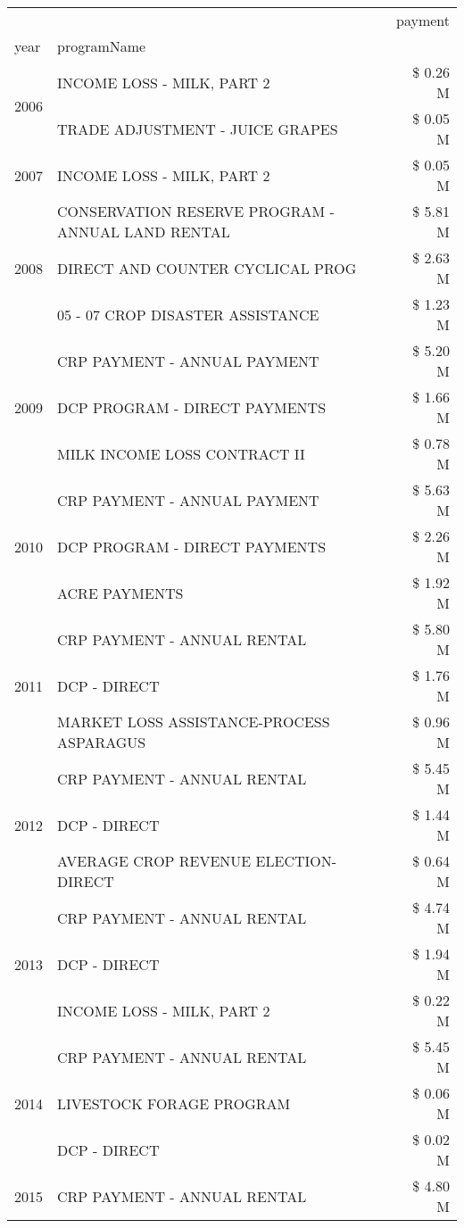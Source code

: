 \begin{tabular}{llr}
\toprule
 &  & payment \\
year & programName &  \\
\midrule
\multirow[t]{2}{*}{2006} & INCOME LOSS - MILK, PART 2 & \$ 0.26 M \\
 & TRADE ADJUSTMENT - JUICE GRAPES & \$ 0.05 M \\
\cline{1-3}
2007 & INCOME LOSS - MILK, PART 2 & \$ 0.05 M \\
\cline{1-3}
\multirow[t]{3}{*}{2008} & CONSERVATION RESERVE PROGRAM - ANNUAL LAND RENTAL & \$ 5.81 M \\
 & DIRECT AND COUNTER CYCLICAL PROG & \$ 2.63 M \\
 & 05 - 07 CROP DISASTER ASSISTANCE & \$ 1.23 M \\
\cline{1-3}
\multirow[t]{3}{*}{2009} & CRP PAYMENT - ANNUAL PAYMENT & \$ 5.20 M \\
 & DCP PROGRAM - DIRECT PAYMENTS & \$ 1.66 M \\
 & MILK INCOME LOSS CONTRACT II & \$ 0.78 M \\
\cline{1-3}
\multirow[t]{3}{*}{2010} & CRP PAYMENT - ANNUAL PAYMENT & \$ 5.63 M \\
 & DCP PROGRAM - DIRECT PAYMENTS & \$ 2.26 M \\
 & ACRE PAYMENTS & \$ 1.92 M \\
\cline{1-3}
\multirow[t]{3}{*}{2011} & CRP PAYMENT - ANNUAL RENTAL & \$ 5.80 M \\
 & DCP - DIRECT & \$ 1.76 M \\
 & MARKET LOSS ASSISTANCE-PROCESS ASPARAGUS & \$ 0.96 M \\
\cline{1-3}
\multirow[t]{3}{*}{2012} & CRP PAYMENT - ANNUAL RENTAL & \$ 5.45 M \\
 & DCP - DIRECT & \$ 1.44 M \\
 & AVERAGE CROP REVENUE ELECTION-DIRECT & \$ 0.64 M \\
\cline{1-3}
\multirow[t]{3}{*}{2013} & CRP PAYMENT - ANNUAL RENTAL & \$ 4.74 M \\
 & DCP - DIRECT & \$ 1.94 M \\
 & INCOME LOSS - MILK, PART 2 & \$ 0.22 M \\
\cline{1-3}
\multirow[t]{3}{*}{2014} & CRP PAYMENT - ANNUAL RENTAL & \$ 5.45 M \\
 & LIVESTOCK FORAGE PROGRAM & \$ 0.06 M \\
 & DCP - DIRECT & \$ 0.02 M \\
\cline{1-3}
\multirow[t]{3}{*}{2015} & CRP PAYMENT - ANNUAL RENTAL & \$ 4.80 M \\

\end{tabular}
